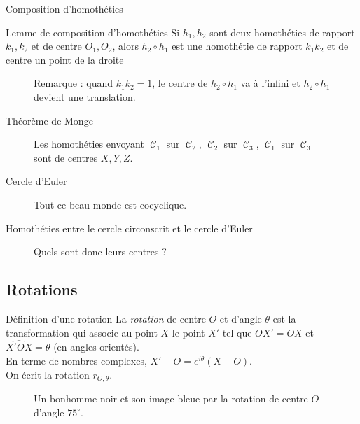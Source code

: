 \documentclass[french]{beamer}
\DeclareMathOperator{\C}{\mathcal C}
\theoremstyle{plain}
\begin{document}
\begin{frame}{Composition d'homothéties}
  \begin{exampleblock}{Lemme de composition d'homothéties}
    Si $ h_1, h_2 $ sont deux homothéties de rapport $ k_1, k_2 $ et de centre $ O_1, O_2 $, alors $ h_2 \circ h_1 $ est une homothétie de rapport $ k_1k_2 $ et de centre un point de la droite
  \end{exampleblock}
  \begin{figure}
    \centering
    \caption{Remarque : quand $ k_1k_2 = 1 $, le centre de $ h_2 \circ h_1 $ va à l'infini et $ h_2 \circ h_1 $ devient une translation.}
  \end{figure}
\end{frame}


\begin{frame}{Théorème de Monge}
  \begin{figure}
    \centering
    \caption{Les homothéties envoyant $ \C_1 $ sur $ \C_2 $, $ \C_2 $ sur $ \C_3 $, $ \C_1 $ sur $ \C_3 $ sont de centres $ X, Y, Z $.}
  \end{figure}
\end{frame}


\begin{frame}{Cercle d'Euler}
  \begin{figure}
    \centering
    \caption{Tout ce beau monde est cocyclique.}
  \end{figure}
\end{frame}


\begin{frame}{Homothéties entre le cercle circonscrit et le cercle d'Euler}
  \begin{figure}
    \centering
    \caption{Quels sont donc leurs centres ?}
  \end{figure}
\end{frame}


\subsection{Rotations}
\begin{frame}{Définition d'une rotation}
  La \textit{rotation} de centre $ O $ et d'angle $ \theta $ est la transformation qui associe au point $ X $ le point $ X' $ tel que $ OX' = OX $ et $ \widehat{X'OX} = \theta $ (en angles orientés). \\
  En terme de nombres complexes, $ X' - O = e^{i\theta}(X - O) $. \\
  On écrit la rotation $ r_{O, \theta} $.
  \begin{figure}
    \centering
    \caption{Un bonhomme noir et son image bleue par la rotation de centre $ O $ d'angle $ 75^\circ $.}
  \end{figure}
\end{frame}
\end{document}
